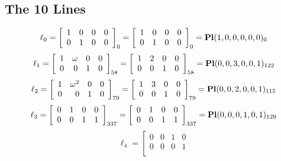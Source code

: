 \documentclass{article}
\begin{document}
{\subsection*{The 10 Lines}
$$
\ell_{0} = 
\left[
\begin{array}{*{4}{r}}
1 & 0 & 0 & 0\\
0 & 1 & 0 & 0\\
\end{array}
\right]
_{0}
=
\left[
\begin{array}{*{4}c}
1  & 0  & 0  & 0\\
0  & 1  & 0  & 0\\
\end{array}
\right]_{0}
={\rm\bf Pl}(1,0,0,0,0,0 )_{0}$$
$$
\ell_{1} = 
\left[
\begin{array}{*{4}{r}}
1 & \omega  & 0 & 0\\
0 & 0 & 1 & 0\\
\end{array}
\right]
_{58}
=
\left[
\begin{array}{*{4}c}
1  & 2  & 0  & 0\\
0  & 0  & 1  & 0\\
\end{array}
\right]_{58}
={\rm\bf Pl}(0,0,3,0,0,1 )_{122}$$
$$
\ell_{2} = 
\left[
\begin{array}{*{4}{r}}
1 & \omega^{2} & 0 & 0\\
0 & 0 & 1 & 0\\
\end{array}
\right]
_{79}
=
\left[
\begin{array}{*{4}c}
1  & 3  & 0  & 0\\
0  & 0  & 1  & 0\\
\end{array}
\right]_{79}
={\rm\bf Pl}(0,0,2,0,0,1 )_{115}$$
$$
\ell_{3} = 
\left[
\begin{array}{*{4}{r}}
0 & 1 & 0 & 0\\
0 & 0 & 1 & 1\\
\end{array}
\right]
_{337}
=
\left[
\begin{array}{*{4}c}
0  & 1  & 0  & 0\\
0  & 0  & 1  & 1\\
\end{array}
\right]_{337}
={\rm\bf Pl}(0,0,0,1,0,1 )_{129}$$
$$
\ell_{4} = 
\left[
\begin{array}{*{4}{r}}
0 & 0 & 1 & 0\\
0 & 0 & 0 & 1\\

\end{array}$$}
\end{document}
